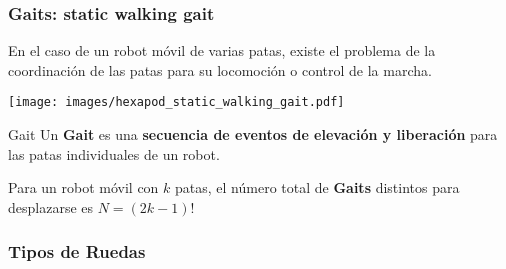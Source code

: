 \begin{frame}
    \frametitle{Gaits: static walking gait}
	\small
    En el caso de un robot móvil de varias patas, existe el problema de la coordinación de las patas para su locomoción o control de la marcha.

    \begin{center}
        \texttt{[image: images/hexapod\_static\_walking\_gait.pdf]}
    \end{center}

	
	\begin{block}{Gait}
    	Un \textbf{Gait} es una \textbf{secuencia de eventos de elevación y liberación} para las patas individuales de un robot.
	\end{block}


    
    Para un robot móvil con $k$ patas, el número total de \textbf{Gaits} distintos para desplazarse es $N = \left( 2k - 1\right)!$
    
\end{frame}

\begin{frame}
    \frametitle{Tipos de Ruedas}

	\begin{figure}[!h]
        \centering
    \end{figure}
\end{frame}

